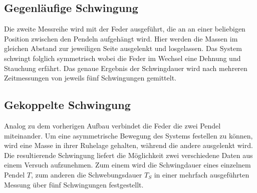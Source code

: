 
\subsection{Gegenläufige Schwingung}
Die zweite Messreihe wird mit der Feder ausgeführt, die an an einer beliebigen Position zwischen den Pendeln aufgehängt wird.
Hier werden die Massen im gleichen Abstand zur jeweiligen Seite ausgelenkt und losgelassen. Das System schwingt
folglich symmetrisch wobei die Feder im Wechsel eine Dehnung und Stauchung erfährt.
Das genaue Ergebnis der Schwingdauer wird nach mehreren Zeitmessungen von jeweils fünf Schwingungen gemittelt.


\subsection{Gekoppelte Schwingung}
Analog zu dem vorherigen Aufbau verbindet die Feder die zwei Pendel miteinander. Um eine asymmetrische Bewegung des Systems 
festellen zu können, wird eine Masse in ihrer Ruhelage gehalten, während die andere ausgelenkt wird.
Die resultierende Schwingung liefert die Möglichkeit zwei verschiedene Daten aus einem Versuch aufzunehmen.
Zum einem wird die Schwingdauer eines einzelnem Pendel $T$, zum anderen die Schwebungsdauer $T_S$ in einer 
mehrfach ausgeführten Messung über fünf Schwingungen festgestellt.




